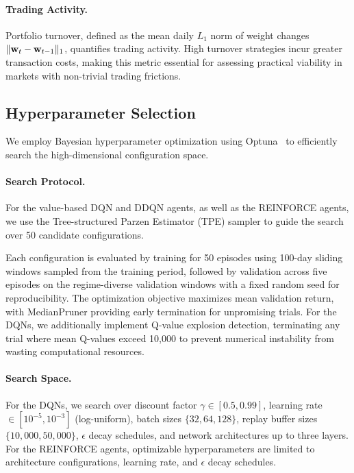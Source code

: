 \paragraph{Trading Activity.} Portfolio turnover, defined as the mean daily $L_1$ norm of weight changes $\|\mathbf{w}_t - \mathbf{w}_{t-1}\|_1$, quantifies trading activity. High turnover strategies incur greater transaction costs, making this metric essential for assessing practical viability in markets with non-trivial trading frictions.


\subsection{Hyperparameter Selection} \label{sec:hyperparameters}
We employ Bayesian hyperparameter optimization using Optuna~\citep{optuna2019} to efficiently search the high-dimensional configuration space.
 
\paragraph{Search Protocol.} For the value-based DQN and DDQN agents, as well as the REINFORCE agents, we use the Tree-structured Parzen Estimator (TPE) sampler to guide the search over 50 candidate configurations.
 
Each configuration is evaluated by training for 50 episodes using 100-day sliding windows sampled from the training period, followed by validation across five episodes on the regime-diverse validation windows with a fixed random seed for reproducibility. The optimization objective maximizes mean validation return, with MedianPruner providing early termination for unpromising trials. For the DQNs, we additionally implement Q-value explosion detection, terminating any trial where mean Q-values exceed 10,000 to prevent numerical instability from wasting computational resources.
 
\paragraph{Search Space.} For the DQNs, we search over discount factor $\gamma \in [0.5, 0.99]$, learning rate $\in [10^{-5}, 10^{-3}]$ (log-uniform), batch sizes $\{32, 64, 128\}$, replay buffer sizes $\{10{,}000, 50{,}000\}$, $\epsilon$ decay schedules, and network architectures up to three layers. For the REINFORCE agents, optimizable hyperparameters are limited to architecture configurations, learning rate, and $\epsilon$ decay schedules.
 
